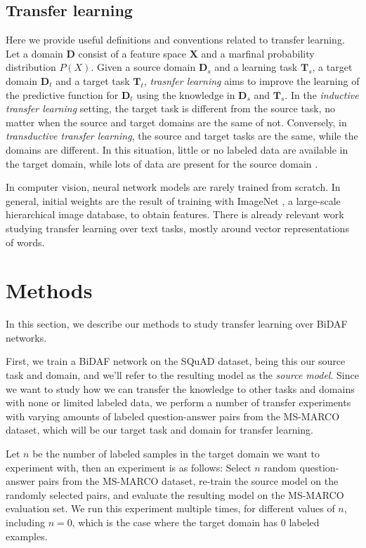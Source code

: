 \documentclass[11pt,a4paper]{article}
\begin{document}
\subsection{Transfer learning}
\label{ssec:transfer_learning}
Here we provide useful definitions and conventions related to transfer learning. Let a domain  $\textbf{D}$ consist of a feature space $\textbf{X}$ and a marfinal probability distribution $P(X)$. Given a source domain $\textbf{D}_s$ and a learning task $\textbf{T}_s$, a target domain $\textbf{D}_t$ and a target task $\textbf{T}_t$, \textit{trasnfer learning} aims to improve the learning of the predictive function for $\textbf{D}_t$ using the knowledge in $\textbf{D}_s$ and $\textbf{T}_s$. In the \textit{inductive transfer learning} setting, the target task is different from the source task, no matter when the source and target domains are the same of not. Conversely, in \textit{transductive transfer learning}, the source and target tasks are the same, while the domains are different. In this situation, little or no labeled data are available in the target domain, while lots of data are present for the source domain \cite{surveytransferlearning} \cite{conneau:2017} \cite{deepcontextualizedwr} \cite{conneau:2017}. 

In computer vision, neural network models are rarely trained from scratch. In general, initial weights are the result of training with ImageNet \cite{imagenet}, a large-scale hierarchical image database, to obtain features. There is already relevant work studying transfer learning over text tasks, mostly around vector representations of words. 

\section{Methods}
\label{sec:methods}

In this section, we describe our methods to study transfer learning over BiDAF networks. 

First, we train a BiDAF network on the SQuAD dataset, being this our source task and domain, and we'll refer to the resulting model as the \textit{source model}. Since we want to study how we can transfer the knowledge to other tasks and domains with none or limited labeled data, we perform a number of transfer experiments with varying amounts of labeled question-answer pairs from the MS-MARCO dataset, which will be our target task and domain for transfer learning.

Let $n$ be the number of labeled samples in the target domain we want to experiment with, then an experiment is as follows: Select $n$ random question-answer pairs from the MS-MARCO dataset, re-train the source model on the randomly selected pairs, and evaluate the resulting model on the MS-MARCO evaluation set. We run this experiment multiple times, for different values of $n$, including $n=0$, which is the case where the target domain has $0$ labeled examples. 
\end{document}
